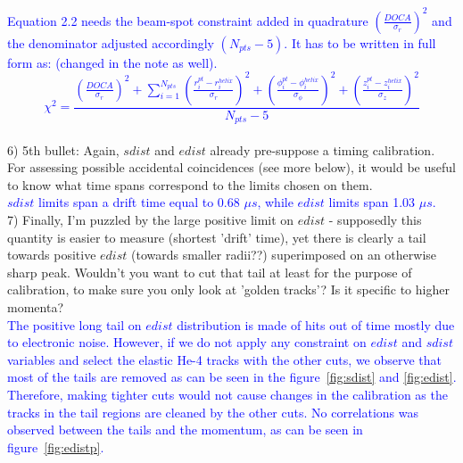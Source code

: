 \textcolor{blue}{Equation 2.2 needs the beam-spot constraint added in
quadrature $\left(\frac{DOCA}{\sigma_r}\right)^2$ and the denominator adjusted
accordingly $(N_{pts}-5)$. It has to be written in full form as: (changed in 
the note as well).  }\\

\textcolor{blue}{
\begin{equation}
   \chi^{2} = \frac{\displaystyle \left(\frac{DOCA}{\sigma_r}\right)^2 
       + \sum_{i = 1}^{ N_{pts}} \left(\frac{r^{pt}_{i} 
      - r^{helix}_{i} }{\sigma_{r}}\right)^{2}  + \left( \frac{\phi^{pt}_{i} - 
      \phi^{helix}_{i} }{\sigma_{\phi}}\right)^{2} + \left( \frac{z^{pt}_{i} - 
      z^{helix}_{i} }{\sigma_{z} } \right)^{2}}{N_{pts} - 5}
\end{equation}
}\\


6) 5th bullet: Again, $sdist$ and $edist$ already pre-suppose a timing 
calibration.  For assessing possible accidental coincidences (see more below), 
it would be useful to know what time spans correspond to the limits chosen on 
them.\\
\textcolor{blue}{ $sdist$ limits span a drift time equal to 0.68 $\mu s$, while 
$edist$ limits span 1.03 $\mu s$.}\\

7) Finally, I'm puzzled by the large positive limit on $edist$ - supposedly this 
quantity is easier to measure (shortest 'drift' time), yet there is clearly a 
tail towards positive $edist$ (towards smaller radii??) superimposed on an 
otherwise sharp peak. Wouldn't you want to cut that tail at least for the 
purpose of calibration, to make sure you only look at 'golden tracks'? Is it 
specific to higher momenta? \\
 \textcolor{blue}{
The positive long tail on $edist$ distribution is made of hits out of time 
mostly due to electronic noise. However, if we do not apply any constraint on 
$edist$ and $sdist$ variables and select the elastic He-4 tracks with the other 
cuts, we observe that most of the tails are removed as can be seen in the 
figure~\ref{fig:sdist} and \ref{fig:edist}. Therefore, making tighter cuts 
would not cause changes in the calibration as the tracks in the tail regions 
are cleaned by the other cuts.  No correlations was observed between the tails 
and the momentum, as can be seen in figure~\ref{fig:edistp}.}\\

